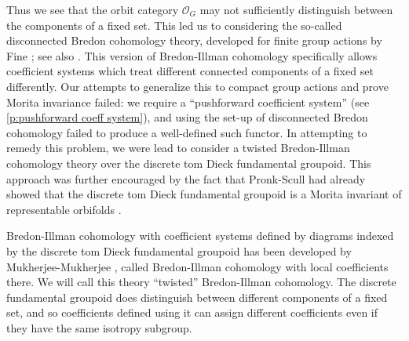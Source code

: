 \documentclass[12pt,reqno]{amsart}
\newcommand{\orbit}{\ensuremath{\mathcal{O}_G}}
\theoremstyle{plain}
\theoremstyle{definition}
\begin{document}
Thus we see that the orbit category $\orbit$ may not sufficiently distinguish between the components of a fixed set.  This led us to considering the so-called disconnected Bredon cohomology theory, developed for finite group actions by Fine \cite{fine}; see also \cite{golasinski:disconnected}.  This version of Bredon-Illman cohomology specifically allows coefficient systems which treat different connected components of a fixed set differently.  Our attempts to generalize this to compact group actions and prove Morita invariance failed: we require a ``pushforward coefficient system'' (see \cref{p:pushforward coeff system}), and using the set-up of disconnected Bredon cohomology failed to produce a well-defined such functor.  In attempting to remedy this problem, we  were lead to consider a twisted Bredon-Illman cohomology theory over the discrete tom Dieck fundamental groupoid. This approach was further encouraged by the fact that  Pronk-Scull had already showed that the discrete tom Dieck fundamental groupoid is a Morita invariant of representable orbifolds \cite{PS:fund-gpd}.  

Bredon-Illman cohomology with coefficient systems defined by diagrams indexed by the discrete tom Dieck fundamental groupoid has been developed by Mukherjee-Mukherjee \cite{MuMu}, called Bredon-Illman cohomology with local coefficients there.   We will call this theory ``twisted'' Bredon-Illman cohomology.  The discrete fundamental groupoid does distinguish between different components of a fixed set, and so coefficients defined using it can assign different coefficients even if they have the same isotropy subgroup.    
\end{document}
